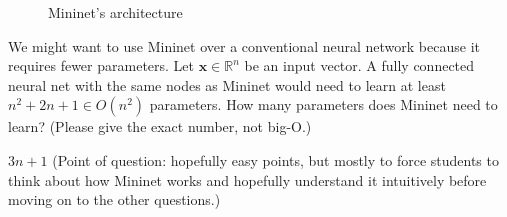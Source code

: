 \begin{parts}
\begin{figure}[H]
        
        \caption{Mininet's architecture}
    \end{figure}


    \begin{subparts}
        \subpart[1]
            We might want to use Mininet over a conventional neural network because it requires fewer parameters. Let $\mathbf{x}\in\mathbb{R}^n$ be an input vector. A fully connected neural net with the same nodes as Mininet would need to learn at least $n^2 + 2n + 1\in O(n^2)$ parameters. How many parameters does Mininet need to learn? (Please give the exact number, not big-O.)
            
            \begin{tcolorbox}[fit,height=2cm, width=15cm, blank, borderline={1pt}{-2pt}]
            \end{tcolorbox}
            \begin{soln}
                $3n + 1$ (Point of question: hopefully easy points, but mostly to force students to think about how Mininet works and hopefully understand it intuitively before moving on to the other questions.)
            \end{soln}
\end{subparts}
\end{parts}
